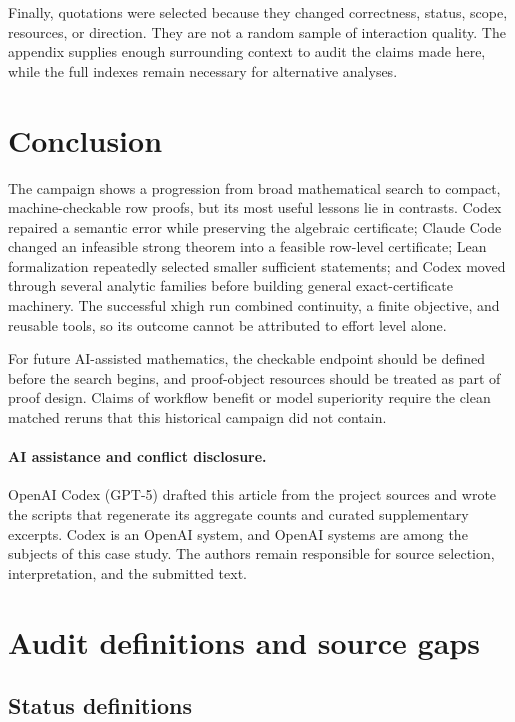 \documentclass[11pt]{article}
\begin{document}
Finally, quotations were selected because they changed correctness, status,
scope, resources, or direction.  They are not a random sample of interaction
quality.  The appendix supplies enough surrounding context to audit the
claims made here, while the full indexes remain necessary for alternative
analyses.

\section{Conclusion}

The campaign shows a progression from broad mathematical search to compact,
machine-checkable row proofs, but its most useful lessons lie in contrasts.
Codex repaired a semantic error while preserving the algebraic certificate;
Claude Code changed an infeasible strong theorem into a feasible row-level
certificate; Lean formalization repeatedly selected smaller sufficient
statements; and Codex moved through several analytic families before building
general exact-certificate machinery.  The successful xhigh run combined
continuity, a finite objective, and reusable tools, so its outcome cannot be
attributed to effort level alone.

For future AI-assisted mathematics, the checkable endpoint should be defined
before the search begins, and proof-object resources should be treated as part
of proof design.  Claims of workflow benefit or model superiority require the
clean matched reruns that this historical campaign did not contain.

\paragraph{AI assistance and conflict disclosure.}
OpenAI Codex (GPT-5) drafted this article from the project sources and wrote
the scripts that regenerate its aggregate counts and curated supplementary
excerpts.  Codex is an OpenAI system, and OpenAI systems are among the subjects
of this case study.  The authors remain responsible for source selection,
interpretation, and the submitted text.

\appendix

\section{Audit definitions and source gaps}
\label{app:audit}

\subsection{Status definitions}
\end{document}
